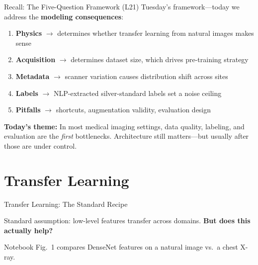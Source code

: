 \documentclass[aspectratio=169,10pt]{beamer}
\begin{document}
\begin{frame}{Recall: The Five-Question Framework (L21)}
Tuesday's framework---today we address the \textbf{modeling consequences}:
\begin{enumerate}
    \item \textbf{Physics} $\to$ determines whether transfer learning from natural images makes sense
    \item \textbf{Acquisition} $\to$ determines dataset size, which drives pre-training strategy
    \item \textbf{Metadata} $\to$ scanner variation causes distribution shift across sites
    \item \textbf{Labels} $\to$ NLP-extracted silver-standard labels set a noise ceiling
    \item \textbf{Pitfalls} $\to$ shortcuts, augmentation validity, evaluation design
\end{enumerate}

\vspace{0.2em}
\textbf{Today's theme:} In most medical imaging settings, data quality, labeling, and evaluation are the \emph{first} bottlenecks. Architecture still matters---but usually after those are under control.
\end{frame}



\section{Transfer Learning}

\begin{frame}{Transfer Learning: The Standard Recipe}
\begin{center}
\end{center}

\vspace{0.2em}
Standard assumption: low-level features transfer across domains. \textbf{But does this actually help?}

{\small Notebook Fig.~1 compares DenseNet features on a natural image vs.\ a chest X-ray.}
\end{frame}
\end{document}
